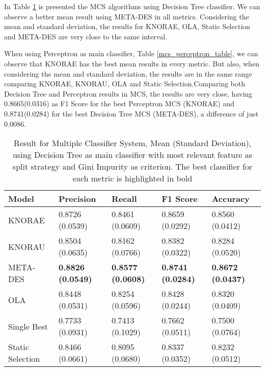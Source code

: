 In Table \ref{mcs_dt_table} is presented the MCS algorithms using Decision Tree classifier. We can observe a better mean result using META-DES in all metrics. Considering the mean and standard deviation, the results for KNORAE, OLA, Static Selection and META-DES are very close to the same interval.

When using Perceptron as main classifier, Table \ref{mcs_perceptron_table}, we can observe that KNORAE has the best mean results in every metric. But also, when considering the mean and standard deviation, the results are in the same range comparing KNORAE, KNORAU, OLA and Static Selection.Comparing both Decision Tree and Perceptron results in MCS, the results are very close, having 0.8665(0.0316) as F1 Score for the best Perceptron MCS (KNORAE) and 0.8741(0.0284) for the best Decision Tree MCS (META-DES), a difference of just 0.0086.

\begin{table}[h!]
    \centering
    \renewcommand{\arraystretch}{1.8}
    \begin{tabular}{ p{3cm}p{2.8cm}p{2.8cm}p{2.8cm}p{2.8cm} }
        \toprule
        Model & Precision & Recall & F1 Score & Accuracy \\
        \midrule
        KNORAE & 0.8726 (0.0539) & 0.8461 (0.0609) & 0.8659 (0.0292) & 0.8560 (0.0412) \\
        KNORAU & 0.8504 (0.0635) & 0.8162 (0.0766) & 0.8382 (0.0322) & 0.8284 (0.0520) \\
        META-DES & \textbf{0.8826 (0.0549)} & \textbf{0.8577 (0.0608)} & \textbf{0.8741 (0.0284)} & \textbf{0.8672 (0.0437)} \\
        OLA & 0.8448 (0.0531) & 0.8254 (0.0596) & 0.8428 (0.0244) & 0.8320 (0.0409) \\
        Single Best & 0.7733 (0.0931) & 0.7413 (0.1029) & 0.7662 (0.0511) & 0.7500 (0.0764) \\
        Static Selection & 0.8466 (0.0661) & 0.8095 (0.0680) & 0.8337 (0.0352) & 0.8232 (0.0512) \\ [1ex]
        \bottomrule
        \end{tabular}
        \caption{%
        Result for Multiple Classifier System, Mean (Standard Deviation), using Decision Tree as main classifier with most relevant feature as split strategy and Gini Impurity as criterion. The best classifier for each metric is highlighted in bold%
        }\label{mcs_dt_table}
\end{table}

